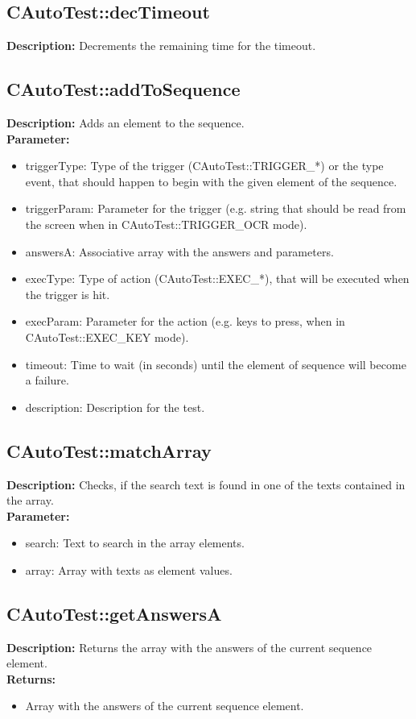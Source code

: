 \subsection{CAutoTest::decTimeout}
\textbf{Description:} Decrements the remaining time for the timeout.\\

\subsection{CAutoTest::addToSequence}
\textbf{Description:} Adds an element to the sequence.\\
\textbf{Parameter:}
\begin{itemize}
\item triggerType: Type of the trigger (CAutoTest::TRIGGER\_*) or the type event, that should happen to begin with the given element of the sequence.
\item triggerParam: Parameter for the trigger (e.g. string that should be read from the screen when in CAutoTest::TRIGGER\_OCR mode).
\item answersA: Associative array with the answers and parameters.
\item execType: Type of action (CAutoTest::EXEC\_*), that will be executed when the trigger is hit.
\item execParam: Parameter for the action (e.g. keys to press, when in CAutoTest::EXEC\_KEY mode).
\item timeout: Time to wait (in seconds) until the element of sequence will become a failure.
\item description: Description for the test.
\end{itemize}

\subsection{CAutoTest::matchArray}
\textbf{Description:} Checks, if the search text is found in one of the texts contained in the array.\\
\textbf{Parameter:}
\begin{itemize}
\item search: Text to search in the array elements.
\item array: Array with texts as element values.
\end{itemize}

\subsection{CAutoTest::getAnswersA}
\textbf{Description:} Returns the array with the answers of the current sequence element.\\
\textbf{Returns:}
\begin{itemize}
\item Array with the answers of the current sequence element.
\end{itemize}

